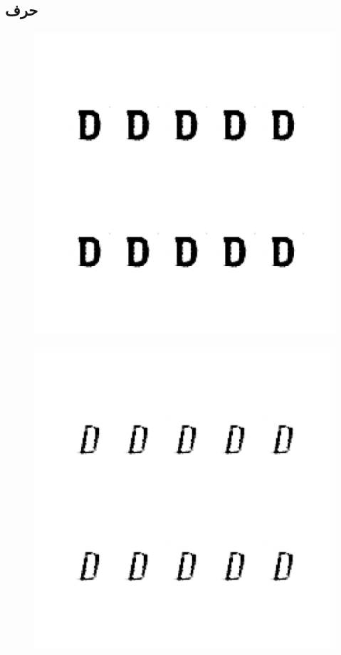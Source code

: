 \documentclass{article}
\begin{document}
\subsection{حرف }
\begin{figure}[H]
	\centerline{\includegraphics[width=\textwidth , height=\textheight ]{../results/CGAN_Adam/figs/letters/D/95.pdf}}
\end{figure}
\begin{figure}[H]
	\centerline{\includegraphics[width=\textwidth , height=\textheight ]{../results/CGAN_Adam/figs/letters/D/90.pdf}}
\end{figure}
\end{document}
